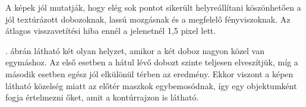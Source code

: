\begin{figure}[tbh]
\centering
\end{figure}

A képek jól mutatják, hogy elég sok pontot sikerült helyreállítani köszönhetően a jól textúrázott dobozoknak, lassú mozgásnak és a megfelelő fényviszoknak. Az átlagos visszavetítési hiba ennél a jelenetnél 1,5 pixel lett.

. ábrán látható két olyan helyzet, amikor a két doboz nagyon közel van egymáshoz. Az első esetben a hátul lévő dobozt szinte teljesen elveszítjük, míg a második esetben egész jól elkülönül térben az eredmény. Ekkor viszont a képen látható közelség miatt az előtér maszkok egybemosódnak, így egy objektumként fogja értelmezni őket, amit a kontúrrajzon is látható.

\begin{figure}[tbh]
\centering
{}
\end{figure}
